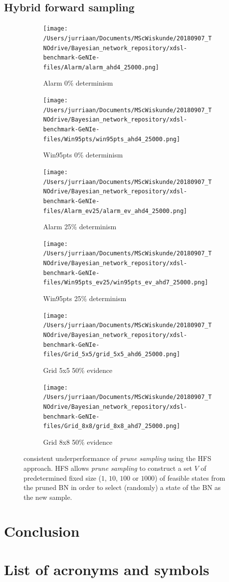 \documentclass[a4paper, twoside, 11pt]{report}
\theoremstyle{plain}
\theoremstyle{definition}
\theoremstyle{remark}
\newcommand{\ps}{\textit{prune sampling }}
\begin{document}
\section{Hybrid forward sampling}
\begin{figure}[h!]
\centering

\begin{subfigure}{.5\linewidth}
\texttt{[image: /Users/jurriaan/Documents/MScWiskunde/20180907\_TNOdrive/Bayesian\_network\_repository/xdsl-benchmark-GeNIe-files/Alarm/alarm\_ahd4\_25000.png]}
\caption{Alarm 0\% determinism}%
\label{alarm_ev}%
\end{subfigure}\hfill%
\begin{subfigure}{.5\linewidth}
\texttt{[image: /Users/jurriaan/Documents/MScWiskunde/20180907\_TNOdrive/Bayesian\_network\_repository/xdsl-benchmark-GeNIe-files/Win95pts/win95pts\_ahd4\_25000.png]}
\caption{Win95pts 0\% determinism}%
\label{win95pts_ev}%
\end{subfigure}

\begin{subfigure}{.5\linewidth}
\texttt{[image: /Users/jurriaan/Documents/MScWiskunde/20180907\_TNOdrive/Bayesian\_network\_repository/xdsl-benchmark-GeNIe-files/Alarm\_ev25/alarm\_ev\_ahd4\_25000.png]}
\caption{Alarm 25\% determinism}%
\label{grid_3x3}%
\end{subfigure}\hfill%
\begin{subfigure}{.5\linewidth}
\texttt{[image: /Users/jurriaan/Documents/MScWiskunde/20180907\_TNOdrive/Bayesian\_network\_repository/xdsl-benchmark-GeNIe-files/Win95pts\_ev25/win95pts\_ev\_ahd7\_25000.png]}
\caption{Win95pts 25\% determinism}%
\label{grid_5x5}%
\end{subfigure}

\begin{subfigure}{.5\linewidth}
\texttt{[image: /Users/jurriaan/Documents/MScWiskunde/20180907\_TNOdrive/Bayesian\_network\_repository/xdsl-benchmark-GeNIe-files/Grid\_5x5/grid\_5x5\_ahd6\_25000.png]}
\caption{Grid 5x5 50\% evidence}%
\label{grid_3x3}%
\end{subfigure}\hfill%
\begin{subfigure}{.5\linewidth}
\texttt{[image: /Users/jurriaan/Documents/MScWiskunde/20180907\_TNOdrive/Bayesian\_network\_repository/xdsl-benchmark-GeNIe-files/Grid\_8x8/grid\_8x8\_ahd7\_25000.png]}
\caption{Grid 8x8 50\% evidence}%
\label{grid_5x5}%
\end{subfigure}

\vspace{0.75pc}
\caption{consistent underperformance of \ps using the \gls{HFS} approach. HFS allows \ps to construct a set $V$ of predetermined fixed size ($1$, $10$, $100$ or $1000$) of feasible states from the pruned BN in order to select (randomly) a state of the BN as the new sample.}
\label{results5}
\end{figure}

\chapter{Conclusion}

\newpage
\chapter*{List of acronyms and symbols}
\printglossaries



\end{document}
